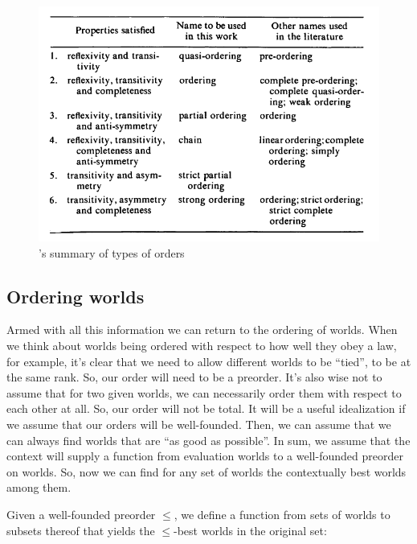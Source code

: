 \begin{figure}[!htb]
  \centering
  \includegraphics{./assets/sen-orders.pdf}
  \caption{\cite{sen-1970-collective-choice}'s summary of types of orders}
  \label{fig:sen-orders}
\end{figure}

\clearpage\subsection{Ordering worlds}
\label{subsec:ordering-worlds}

Armed with all this information we can return to the ordering of worlds. When we
think about worlds being ordered with respect to how well they obey a law, for
example, it's clear that we need to allow different worlds to be ``tied'', to be
at the same rank. So, our order will need to be a preorder. It's also wise not
to assume that for two given worlds, we can necessarily order them with respect
to each other at all. So, our order will not be total. %
%
It will be a useful idealization if we assume that our orders will be
well-founded. Then, we can assume that we can always find worlds that are ``as
good as possible''. In sum, we assume that the context will supply a function
from evaluation worlds to a well-founded preorder on worlds. So, now we can find
for any set of worlds the contextually best worlds among them.

%
Given a well-founded preorder $\le$, we define a function from sets of worlds to
subsets thereof that yields the $\le$-best worlds in the original set:

